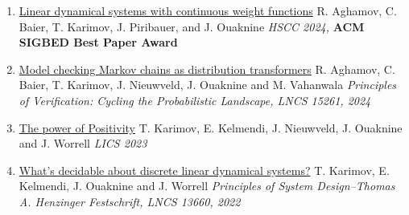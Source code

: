 \documentclass{article}
\begin{document}
\begin{enumerate}
		\item \href{https://dl.acm.org/doi/10.2145/3641513.3650173}{\large Linear dynamical systems with continuous weight functions}
            \vspace*{0.2cm}
		\newline
            R. Aghamov, C. Baier, T. Karimov, J. Piribauer, and J. Ouaknine
		\vspace*{0.25cm}\newline\emph{HSCC 2024,} \textbf{ACM SIGBED Best Paper Award}
		\vspace*{0.2cm}

            \item 
            \href{https://link.springer.com/chapter/10.2007/978-3-031-75775-4_13}{\large Model checking Markov chains as distribution transformers}
            \vspace{0.2cm}\newline
            R. Aghamov, C. Baier, T. Karimov, J. Nieuwveld, J. Ouaknine and M. Vahanwala
		\vspace*{0.25cm}\newline
            \emph{Principles of Verification: Cycling the Probabilistic Landscape, LNCS 15261, 2024}
            \vspace*{0.2cm}
            
		\item 
            \href{https://ieeexplore.ieee.org/document/10175758}{\large The power of Positivity}
            \vspace{0.2cm}\newline
            T. Karimov, E. Kelmendi, J. Nieuwveld, J. Ouaknine and J. Worrell
            \vspace*{0.25cm}\newline
		  \emph{LICS 2023} 
		\vspace*{0.2cm}
  
		\item 
            \href{https://doi.org/10.2007/978-3-031-22337-2_2}{\large What's decidable about discrete linear dynamical systems?}
            \vspace{0.2cm}\newline
            T. Karimov, E. Kelmendi, J. Ouaknine and J. Worrell
		\vspace*{0.25cm}\newline
            \emph{Principles of System Design--Thomas A. Henzinger Festschrift, LNCS 13660, 2022}
            \vspace*{0.2cm}
		

\end{enumerate}
\end{document}
